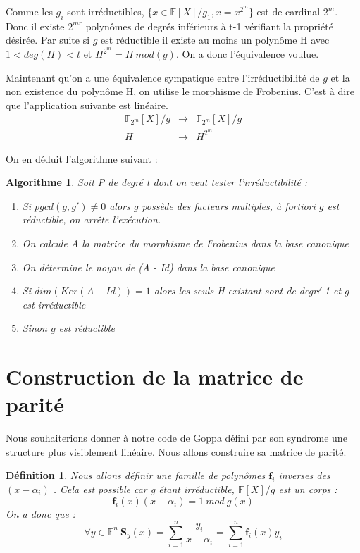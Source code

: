 \documentclass{article}
\newtheorem{algo}{Algorithme}
\newtheorem{defi}{Définition}
\begin{document}
		Comme les $g_{i}$ sont irréductibles, $\{x \in \mathbb{F}[X]/g_{1}, x = x^{2^{m}} \}$ est de cardinal $2^{m}$.
		Donc il existe $2^{mr}$ polynômes de degrés inférieurs à t-1 vérifiant la propriété désirée.
		Par suite si $g$ est réductible il existe au moins un polynôme H avec $1 < deg(H) < t$ et $H^{2^{m}} = H \ mod(g)$.
		On a donc l'équivalence voulue.

		Maintenant qu'on a une équivalence sympatique entre l'irréductibilité de $g$ et la non existence du polynôme H, on utilise le morphisme de Frobenius.
		C'est à dire que l'application suivante est linéaire.
		\begin{eqnarray*}
			\mathbb{F}_{2^{m}}[X]/g &\rightarrow& \mathbb{F}_{2^{m}}[X]/g \\
			H &\rightarrow& H^{2^{m}}
		\end{eqnarray*}

		On en déduit l'algorithme suivant :
		\begin{algo}
			Soit P de degré t dont on veut tester l'irréductibilité :
			\begin{enumerate}
				\item Si $pgcd(g,g') \neq 0$ alors $g$ possède des facteurs multiples, à fortiori $g$ est réductible, on arrête l’exécution.
				\item On calcule A la matrice du morphisme de Frobenius dans la base canonique
				\item On détermine le noyau de (A - Id) dans la base canonique
				\item Si $dim(Ker(A-Id)) = 1$ alors les seuls H existant sont de degré 1 et $g$ est irréductible
				\item Sinon $g$ est réductible
			\end{enumerate}
		\end{algo}

	\section{Construction de la matrice de parité}
		\label{parite}
		\cite{04cc}
		Nous souhaiterions donner à notre code de Goppa défini par son syndrome une structure plus visiblement linéaire. Nous allons construire sa matrice de parité.

		\begin{defi}
			Nous allons définir une famille de polynômes  $ \mathbf{f}_{i} $  inverses des  $ (x-\alpha_{i}) $ . Cela est possible car g étant irréductible,  $ \mathbb{F}[X]/g $  est un corps :
			 $$  \mathbf{f}_{i}(x)(x-\alpha_{i}) = 1 \ mod \ g(x) $$ 
			On a donc que :
			 $$ \forall y \in \mathbb{F}^{n} \ \mathbf{S}_{y}(x) = \sum_{i=1}^{n} \frac{y_{i}}{x-\alpha_{i}} = \sum_{i=1}^{n} \mathbf{f}_{i}(x)y_{i}  $$ 
		\end{defi}
\end{document}

